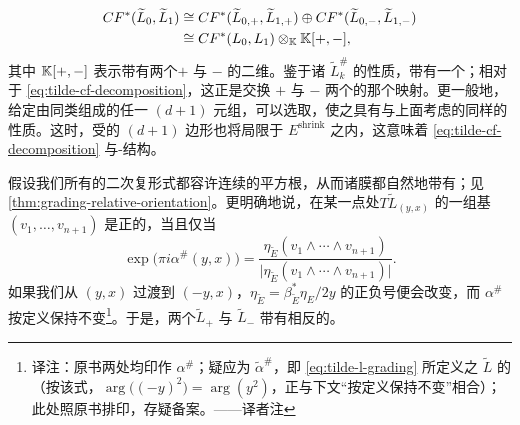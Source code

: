 \begin{equation}\label{eq:tilde-cf-decomposition}
\begin{aligned}
CF^*(\widetilde{L}_0,\widetilde{L}_1)&\cong CF^*(\widetilde{L}_{0,+},\widetilde{L}_{1,+})\oplus CF^*(\widetilde{L}_{0,-},\widetilde{L}_{1,-})\\
&\cong CF^*(L_0,L_1)\otimes_{\mathbb{K}}\mathbb{K}[+,-],
\end{aligned}
\end{equation}
其中 $\mathbb{K}[+,-]$ 表示带有两个\trGenerator{}$+$ 与 $-$ 的二维\trVectorSpace。鉴于诸 $\widetilde{L}^{\#}_k$ 的\trEquivariant{}性质，\trFloerComplex{}带有一个\trCanonical{}\trInvolution；相对于 \eqref{eq:tilde-cf-decomposition}，这正是交换 $+$ 与 $-$ 两个\trGenerator{}的那个映射。更一般地，给定由同类\trLagrange\trBrane{}组成的任一 $(d{+}1)$ 元组，可以选取\trPerturbationDatum，使之具有与上面考虑的\trFloerDatum{}同样的性质。这时，受\trPerturbation{}的\trHolomorphic{} $(d{+}1)$ 边形也将局限于 $E^{\mathrm{shrink}}$ 之内，这意味着 \eqref{eq:tilde-cf-decomposition} 与\trAinfty-结构\trCompatible。
\begin{remark}\label{thm:square-roots-natural-orientation}
假设我们所有的二次复\trVolume{}形式都容许连续的平方根，从而诸膜都自然地带有\trOrientation；见\cref{thm:grading-relative-orientation}。更明确地说，在某一点处\trTangentSpace{}$T\widetilde{L}_{(y,x)}$ 的一组基 $(v_1,\ldots,v_{n+1})$ 是正\trOrientation{}的，当且仅当
\begin{equation*}
\exp\bigl(\pi i\alpha^{\#}(y,x)\bigr)=\frac{\eta_{\widetilde{E}}(v_1\wedge\cdots\wedge v_{n+1})}{\bigl|\eta_{\widetilde{E}}(v_1\wedge\cdots\wedge v_{n+1})\bigr|}.
\end{equation*}
如果我们从 $(y,x)$ 过渡到 $(-y,x)$，$\eta_{\widetilde{E}}=\beta_{\widetilde{E}}^*\eta_E/2y$ 的正负号便会改变，而 $\alpha^{\#}$ 按定义保持不变\footnote{译注：原书两处均印作 $\alpha^{\#}$；疑应为 $\tilde{\alpha}^{\#}$，即 \eqref{eq:tilde-l-grading} 所定义之 $\widetilde{L}$ 的\trGrading{}（按该式，$\arg\bigl((-y)^2\bigr)=\arg(y^2)$，正与下文“按定义保持不变”相合）；此处照原书排印，存疑备案。——译者注}。于是，两个\trConnectedComponent{}$\widetilde{L}_+$ 与 $\widetilde{L}_-$ 带有相反的\trOrientation。
\end{remark}
